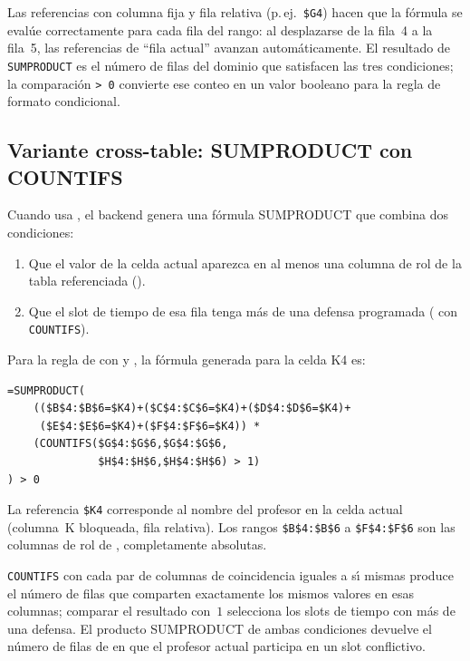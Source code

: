 Las referencias con columna fija y fila relativa (p.\,ej.\ \texttt{\$G4})
hacen que la f\'ormula se eval\'ue correctamente para cada fila del rango:
al desplazarse de la fila~4 a la fila~5, las referencias de ``fila actual''
avanzan autom\'aticamente.  El resultado de \texttt{SUMPRODUCT} es el n\'umero
de filas del dominio que satisfacen las tres condiciones; la comparaci\'on
\texttt{> 0} convierte ese conteo en un valor booleano para la regla de
formato condicional.

\subsection{Variante cross-table: SUMPRODUCT con COUNTIFS}
\label{ssec:cf-cross-table}

Cuando  usa , el backend genera una f\'ormula
SUMPRODUCT que combina dos condiciones:
\begin{enumerate}
  \item Que el valor de la celda actual aparezca en al menos una columna de
    rol de la tabla referenciada ().
  \item Que el slot de tiempo de esa fila tenga m\'as de una defensa
    programada ( con \texttt{COUNTIFS}).
\end{enumerate}

Para la regla de  con
 y ,
la f\'ormula generada para la celda K4 es:

\begin{lstlisting}[style=pythonstyle,
  caption={F\'ormula Excel CF para la variante cross-table (celda K4).}]
=SUMPRODUCT(
    (($B$4:$B$6=$K4)+($C$4:$C$6=$K4)+($D$4:$D$6=$K4)+
     ($E$4:$E$6=$K4)+($F$4:$F$6=$K4)) *
    (COUNTIFS($G$4:$G$6,$G$4:$G$6,
              $H$4:$H$6,$H$4:$H$6) > 1)
) > 0
\end{lstlisting}

La referencia \texttt{\$K4} corresponde al nombre del profesor en la celda
actual (columna~K bloqueada, fila relativa).  Los rangos
\texttt{\$B\$4:\$B\$6} a \texttt{\$F\$4:\$F\$6} son las columnas de rol de
, completamente absolutas.

\texttt{COUNTIFS} con cada par de columnas de coincidencia iguales a s\'{\i}
mismas produce el n\'umero de filas que comparten exactamente los mismos
valores en esas columnas; comparar el resultado con~$1$ selecciona los
slots de tiempo con m\'as de una defensa.  El producto SUMPRODUCT de ambas
condiciones devuelve el n\'umero de filas de  en que el
profesor actual participa en un slot conflictivo.

